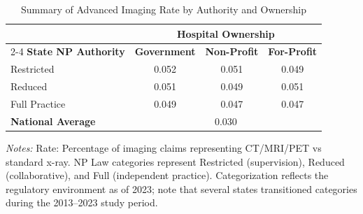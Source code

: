 \begin{table}[htbp]
    \centering
    \caption{Summary of Advanced Imaging Rate by Authority and Ownership}
    \label{tab:partb_imaging_adv_rate}
    \vspace{0.2cm}
    \begin{tabular}{lccc}
        \toprule
        & \multicolumn{3}{c}{\textbf{Hospital Ownership}} \\
        \cmidrule(lr){2-4}
        \textbf{State NP Authority} & \textbf{Government} & \textbf{Non-Profit} & \textbf{For-Profit} \\
        \midrule
        Restricted & 0.052 & 0.051 & 0.049 \\
        Reduced & 0.051 & 0.049 & 0.051 \\
        Full Practice & 0.049 & 0.047 & 0.047 \\
        \midrule
        \textbf{National Average} & \multicolumn{3}{c}{0.030} \\
        \bottomrule
    \end{tabular}
    \vspace{0.1cm}
    \begin{minipage}{0.85\textwidth}
        \footnotesize \textit{Notes:} Rate: Percentage of imaging claims representing CT/MRI/PET vs standard x-ray. NP Law categories represent Restricted (supervision), Reduced (collaborative), and Full (independent practice). Categorization reflects the regulatory environment as of 2023; note that several states transitioned categories during the 2013--2023 study period.
    \end{minipage}
\end{table}